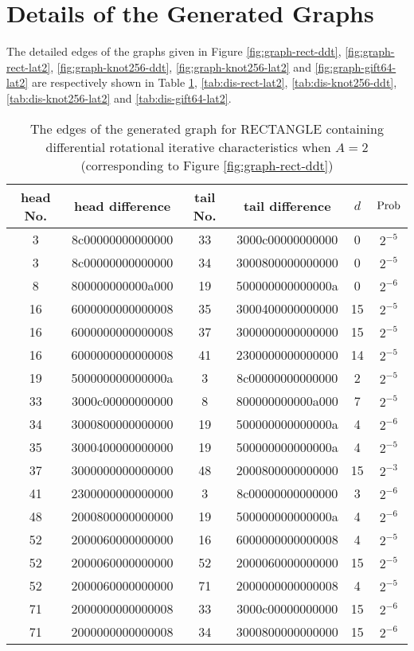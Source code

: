 \section{Details of the Generated Graphs}

The detailed edges of the graphs given in Figure \ref{fig:graph-rect-ddt}, \ref{fig:graph-rect-lat2}, \ref{fig:graph-knot256-ddt}, \ref{fig:graph-knot256-lat2} and \ref{fig:graph-gift64-lat2} are respectively shown in Table \ref{tab:dis-rect-ddt}, \ref{tab:dis-rect-lat2}, \ref{tab:dis-knot256-ddt}, \ref{tab:dis-knot256-lat2} and \ref{tab:dis-gift64-lat2}. 

\begin{table}
	\caption{The edges of the generated graph for RECTANGLE containing differential rotational iterative characteristics when $A=2$ (corresponding to Figure \ref{fig:graph-rect-ddt})}\label{tab:dis-rect-ddt}
	\centering
	\begin{tabular}{|c|c|c|c|c|c|}
		\hline
		head No. & head difference & tail No. & tail difference & $d$ & $\text{Prob}$ \\
		\hline
		3 & 8c00000000000000 & 33 & 3000c00000000000 & 0 & $2^{-5}$ \\
        3 & 8c00000000000000 & 34 & 3000800000000000 & 0 & $2^{-5}$ \\
        8 & 800000000000a000 & 19 & 500000000000000a & 0 & $2^{-6}$ \\
        16 & 6000000000000008 & 35 & 3000400000000000 & 15 & $2^{-5}$ \\
        16 & 6000000000000008 & 37 & 3000000000000000 & 15 & $2^{-5}$ \\
        16 & 6000000000000008 & 41 & 2300000000000000 & 14 & $2^{-5}$ \\
        19 & 500000000000000a & 3 & 8c00000000000000 & 2 & $2^{-5}$ \\
        33 & 3000c00000000000 & 8 & 800000000000a000 & 7 & $2^{-5}$ \\
        34 & 3000800000000000 & 19 & 500000000000000a & 4 & $2^{-6}$ \\
        35 & 3000400000000000 & 19 & 500000000000000a & 4 & $2^{-5}$ \\
        37 & 3000000000000000 & 48 & 2000800000000000 & 15 & $2^{-3}$ \\
        41 & 2300000000000000 & 3 & 8c00000000000000 & 3 & $2^{-6}$ \\
        48 & 2000800000000000 & 19 & 500000000000000a & 4 & $2^{-6}$ \\
        52 & 2000060000000000 & 16 & 6000000000000008 & 4 & $2^{-5}$ \\
        52 & 2000060000000000 & 52 & 2000060000000000 & 15 & $2^{-5}$ \\
        52 & 2000060000000000 & 71 & 2000000000000008 & 4 & $2^{-5}$ \\
        71 & 2000000000000008 & 33 & 3000c00000000000 & 15 & $2^{-6}$ \\
        71 & 2000000000000008 & 34 & 3000800000000000 & 15 & $2^{-6}$ \\
		\hline
	\end{tabular}
\end{table}

